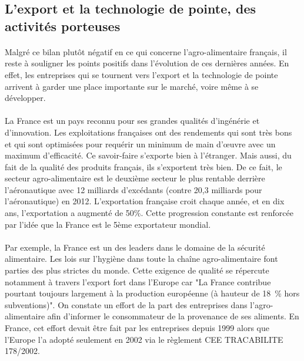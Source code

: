 \documentclass[a4paper,12pt]{report}
\begin{document}
		\subsection{L'export et la technologie de pointe, des activités porteuses}
			\paragraph{}Malgré ce bilan plutôt négatif en ce qui concerne l’agro-alimentaire français, il reste à souligner les points positifs dans l’évolution de ces dernières années. En effet, les entreprises qui se tournent vers l’export et la technologie de pointe arrivent à garder une place importante sur le marché, voire même à se développer.
			
			\paragraph{}La France est un pays reconnu pour ses grandes qualités d’ingénérie et d’innovation. Les exploitations françaises ont des rendements qui sont très bons et qui sont optimisées pour requérir un minimum de main d'œuvre avec un maximum d’efficacité. Ce savoir-faire s’exporte bien à l’étranger. Mais aussi, du fait de la qualité des produits français, ils s’exportent très bien. De ce fait, le secteur agro-alimentaire est le deuxième secteur le plus rentable derrière l’aéronautique avec 12 milliards d’excédants (contre 20,3 milliards pour l’aéronautique) en 2012\cite{AAExport2014}. L’exportation française croit chaque année, et en dix ans, l’exportation a augmenté de 50\%. Cette progression constante est renforcée par l’idée que la France est le 5ème exportateur mondial.
			
			\paragraph{}Par exemple, la France est un des leaders dans le domaine de la sécurité alimentaire. Les lois sur l'hygiène dans toute la chaîne agro-alimentaire font parties des plus strictes du monde. Cette exigence de qualité se répercute notamment à travers l'export fort dans l'Europe  car "La France contribue pourtant toujours largement à la production
			européenne (à hauteur de 18 \% hors subventions)".\cite{TechnoCle}	On constate un effort de la part des entreprises dans l'agro-alimentaire afin d'informer le consommateur de la provenance de ses aliments. En France, cet effort devait être fait par les entreprises depuis 1999 alors que l'Europe l'a adopté seulement en 2002 via  le règlement CEE TRACABILITE 178/2002.\cite{Tracabilite}
			
\end{document}
